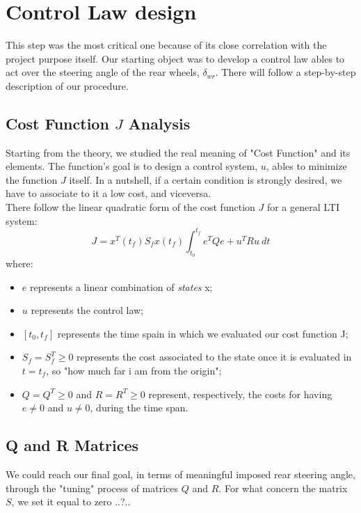 \section{Control Law design}
This step was the most critical one because of its close correlation with the project purpose itself. Our starting object was to develop a control law ables to act over the steering angle of the rear wheels, $\delta_{wr}$. There will follow a step-by-step description of our procedure.
\subsection{Cost Function $J$ Analysis}
Starting from the theory, we studied the real meaning of "Cost Function" and its elements. The function's goal is to design a control system, $u$, ables to minimize the function $J$ itself. In a nutshell, if a certain condition is strongly desired, we have to associate to it a low cost, and viceversa. \\
There follow the linear quadratic form of the cost function $J$ for a general LTI system:
\begin{equation}
J = x^{T}(t_{f}) S_{f} x(t_{f})\int_{t_{0}}^{t_{f}} e^{T} Q e + u^{T} R u \ dt
\end{equation}
where:
\begin{itemize}
	\item $e$ represents a linear combination of \textit{states} x;
	\item $u$ represents the control law;
	\item $ [t_{0},t_{f}] $ represents the time spain in which we evaluated our cost function J;
	\item $ S_{f} = S_{f}^{T} \geq0 $ represents the cost associated to the state once it is evaluated in $t=t_{f}$, so "how much far i am from the origin";
	\item $ Q=Q^{T}\geq 0 $ and $ R=R^{T}\geq 0 $ represent, respectively, the costs for having $e\neq0$ and $u\neq0$, during the time span.
\end{itemize}
\subsection{Q and R Matrices}
We could reach our final goal, in terms of meaningful imposed rear steering angle, through the "tuning" process of matrices $Q$ and $R$. For what concern the matrix $S$, we set it equal to zero ..?..	
